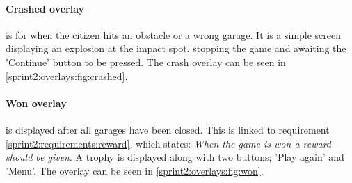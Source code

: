 \paragraph{Crashed overlay} is for when the citizen hits an obstacle or a wrong garage.
It is a simple screen displaying an explosion at the impact spot, stopping the game and awaiting the 'Continue' button to be pressed.
The crash overlay can be seen in \cref{sprint2:overlays:fig:crashed}.

\paragraph{Won overlay} is displayed after all garages have been closed.
This is linked to requirement \ref{sprint2:requirements:reward}, which states: \textit{When the game is won a reward should be given}.
A trophy is displayed along with two buttons; 'Play again' and 'Menu'.
The overlay can be seen in \cref{sprint2:overlays:fig:won}.